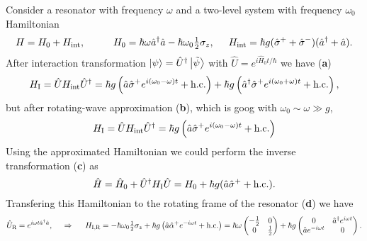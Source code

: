 Consider a resonator with frequency $\omega$ and a two-level system with frequency $\omega_0$ Hamiltonian
\begin{equation*}
	H = H_0 + \sub{H}{int},
	\hspace{10 mm} 
	H_0 = \hbar \omega \hat{a}\D \hat{a} - \hbar \omega_0 \tfrac{1}{2}\sigma_z,
	\hspace{5 mm} 
	\sub{H}{int} = \hbar g(\hat{\sigma}^+ + \hat{\sigma}^-) (\hat{a}\D + \hat{a}).
\end{equation*}
After interaction transformation $\left| \psi \right\rangle = \hat{U}^{\dag} \left| \tilde{\psi} \right\rangle$ with $\hat{U} = e^{i \hat{H}_0 t / \hbar}$ we have (\textbf{a})
\begin{equation*}
	H_{\textnormal{I}} = \hat{U} H_{\textnormal{int}} \hat{U}^{\dag} = \hbar g \left(
		\hat{a} \hat{\sigma}^+ e^{i(\omega_0 - \omega)t} + \textnormal{h.c.}
	\right) + \hbar g \left(
		\hat{a}^{\dag} \hat{\sigma}^+ e^{i(\omega_0 + \omega)t} + \textnormal{h.c.}
	\right),
\end{equation*}
but after rotating-wave approximation (\textbf{b}), which is goog with $\omega_0 \sim \omega \gg g$,
\begin{equation*}
	H_{\textnormal{I}} = \hat{U} H_{\textnormal{int}} \hat{U}^{\dag} = \hbar g \left(
		\hat{a} \hat{\sigma}^+ e^{i(\omega_0 - \omega)t} + \textnormal{h.c.}
	\right)
	\label{QHHI}
\end{equation*}
Using the approximated Hamiltonian we could perform the inverse transformation (\textbf{c}) as
\begin{equation*}
	\hat{H} = \hat{H}_0 + \hat{U}^{\dag} H_{\textnormal{I}} \hat{U} = H_0 + \hbar g (\hat{a} \hat{\sigma}^+ + \textnormal{h.c.}).
\end{equation*}
Transfering this Hamiltonian to the rotating frame of the resonator  (\textbf{d}) we have
\begin{equation*}
	\hat{U}_{\textnormal{R}}= e^{i \omega t \hat{a}^{\dag} \hat{a}},
	\hspace{0.5cm} \Rightarrow \hspace{0.5cm}
	H_{\textnormal{I,R}} = - \hbar \omega_0 \tfrac{1}{2}\sigma_z + \hbar g \left(
		\hat{a} \hat{\alpha}^+ e^{-i \omega t} + \textnormal{h.c.}
	\right) = \hbar \omega \begin{pmatrix}
	    -\tfrac{1}{2} & 0 \\
	    0 & \tfrac{1}{2} \\
	\end{pmatrix}
	 + \hbar g \begin{pmatrix}
	     0 & \hat{a}^{\dag} e^{i \omega t} \\
	     \hat{a} e^{- i \omega t} & 0 \\
	 \end{pmatrix}.
\end{equation*}

